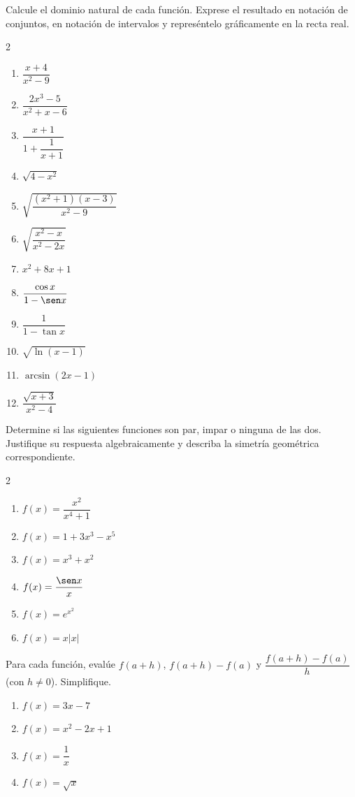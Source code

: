 \begin{prob}
Calcule el dominio natural de cada función. Exprese el resultado en notación de conjuntos, en notación de intervalos y represéntelo gráficamente en la recta real.
\begin{multicols}{2}
\begin{enumerate}
  \item $\dfrac{x+4}{x^2-9}$
  \item $\dfrac{2x^3-5}{x^2+x-6}$
  \item $\dfrac{x+1}{1+\dfrac{1}{x+1}}$
  \item $\sqrt{4-x^2}$
  \item $\sqrt{\dfrac{(x^2+1)(x-3)}{x^2-9}}$
  \item $\sqrt{\dfrac{x^2-x}{x^2-2x}}$
  \item $x^2+8x+1$
  \item $\dfrac{\cos x}{1-\sen x}$
  \item $\dfrac{1}{1-\tan x}$
  \item $\sqrt{\ln(x-1)}$
  \item $\arcsin(2x-1)$
  \item $\dfrac{\sqrt{x+3}}{x^2-4}$
\end{enumerate}
\end{multicols}
\end{prob}

\begin{prob}
Determine si las siguientes funciones son par, impar o ninguna de las dos. Justifique su respuesta algebraicamente y describa la simetría geométrica correspondiente.
\begin{multicols}{2}
\begin{enumerate}
  \item $f(x)=\dfrac{x^2}{x^4+1}$
  \item $f(x)=1+3x^3-x^5$
  \item $f(x)=x^3+x^2$
  \item $f(x)=\dfrac{\sen x}{x}$
  \item $f(x)=e^{x^2}$
  \item $f(x)=x|x|$
\end{enumerate}
\end{multicols}
\end{prob}

\begin{prob}
Para cada función, evalúe $f(a+h)$, $f(a+h)-f(a)$ y $\dfrac{f(a+h)-f(a)}{h}$ (con $h \neq 0$). Simplifique.
\begin{enumerate}
  \item $f(x) = 3x - 7$
  \item $f(x) = x^2 - 2x + 1$
  \item $f(x) = \dfrac{1}{x}$
  \item $f(x) = \sqrt{x}$
\end{enumerate}
\end{prob}

